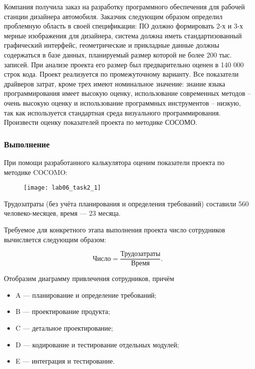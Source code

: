 Компания получила заказ на разработку программного обеспечения для рабочей станции дизайнера автомобиля. 
Заказчик следующим образом определил проблемную область в своей спецификации: ПО должно формировать 2-х и 3-х мерные изображения для дизайнера, система должна иметь стандартизованный графический интерфейс, геометрические и прикладные данные должны содержаться в базе данных, планируемый размер которой не более 200 тыс. записей. При анализе проекта его размер был предварительно оценен в 140 000 строк кода. 
Проект реализуется по промежуточному варианту. 
Все  показатели драйверов затрат, кроме трех имеют номинальное значение: знание языка программирования имеет высокую оценку, использование современных методов – очень высокую оценку и использование программных инструментов – низкую, так как используется стандартная среда визуального программирования.
Произвести оценку показателей проекта по методике СОСОМО. 

\subsubsection{Выполнение}

При помощи разработанного калькулятора оценим показатели проекта по методике COCOMO:

\begin{figure}[h!]
	\texttt{[image: lab06\_task2\_1]}
\end{figure}

Трудозатраты (без учёта планирования и определения требований) составили 560 человеко-месяцев, время --- 23 месяца.

Требуемое для конкретного этапа выполнения проекта число сотрудников вычисляется следующим образом:

\begin{equation}
	\text{Число} = \frac{\text{Трудозатраты}}{\text{Время}}.
\end{equation}

Отобразим диаграмму привлечения сотрудников, причём 

\begin{itemize}
	\item A --- планирование и определение требований;
	\item B --- проектирование продукта;
	\item C --- детальное проектирование;
	\item D --- кодирование и тестирование отдельных модулей;
	\item E --- интеграция и тестирование.
\end{itemize}


